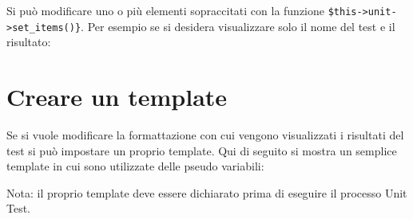 Si può modificare uno o più elementi sopraccitati con la funzione \verb|$this->unit->set_items()}|. Per esempio se si desidera visualizzare solo il nome del test e il risultato:


\section*{Creare un template}

Se si vuole modificare la formattazione con cui vengono visualizzati i risultati del test si può impostare un proprio template. Qui di seguito si mostra un semplice template in cui sono utilizzate delle pseudo variabili:


Nota: il proprio template deve essere dichiarato prima di eseguire il processo Unit Test.